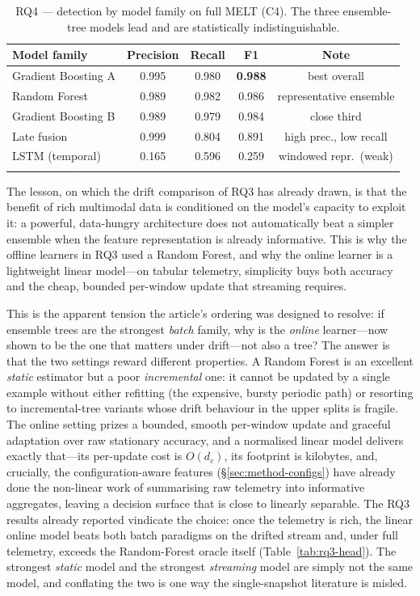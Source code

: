 \documentclass[pdflatex,sn-mathphys-num]{sn-jnl}%
\theoremstyle{thmstyleone}%
\theoremstyle{thmstyletwo}%
\theoremstyle{thmstylethree}%
\begin{document}
\begin{table}[t]
\caption{RQ4 --- detection by model family on full MELT (C4). The three ensemble-tree models lead and are statistically indistinguishable.}\label{tab:rq4}
\begin{tabular}{@{}lcccc@{}}
\toprule
Model family & Precision & Recall & F1 & Note \\
\midrule
Gradient Boosting A  & 0.995 & 0.980 & \textbf{0.988} & best overall \\
Random Forest        & 0.989 & 0.982 & 0.986 & representative ensemble \\
Gradient Boosting B  & 0.989 & 0.979 & 0.984 & close third \\
Late fusion          & 0.999 & 0.804 & 0.891 & high prec., low recall \\
LSTM (temporal)      & 0.165 & 0.596 & 0.259 & windowed repr.\ (weak) \\
\botrule
\end{tabular}
\end{table}

The lesson, on which the drift comparison of RQ3 has already drawn, is that the benefit of rich multimodal data is conditioned on the model's capacity to exploit it: a powerful, data-hungry architecture does not automatically beat a simpler ensemble when the feature representation is already informative. This is why the offline learners in RQ3 used a Random Forest, and why the online learner is a lightweight linear model---on tabular telemetry, simplicity buys both accuracy and the cheap, bounded per-window update that streaming requires.

This is the apparent tension the article's ordering was designed to resolve: if ensemble trees are the strongest \emph{batch} family, why is the \emph{online} learner---now shown to be the one that matters under drift---not also a tree? The answer is that the two settings reward different properties. A Random Forest is an excellent \emph{static} estimator but a poor \emph{incremental} one: it cannot be updated by a single example without either refitting (the expensive, bursty periodic path) or resorting to incremental-tree variants whose drift behaviour in the upper splits is fragile. The online setting prizes a bounded, smooth per-window update and graceful adaptation over raw stationary accuracy, and a normalised linear model delivers exactly that---its per-update cost is $O(d_c)$, its footprint is kilobytes, and, crucially, the configuration-aware features (\S\ref{sec:method-configs}) have already done the non-linear work of summarising raw telemetry into informative aggregates, leaving a decision surface that is close to linearly separable. The RQ3 results already reported vindicate the choice: once the telemetry is rich, the linear online model beats both batch paradigms on the drifted stream and, under full telemetry, exceeds the Random-Forest oracle itself (Table~\ref{tab:rq3-head}). The strongest \emph{static} model and the strongest \emph{streaming} model are simply not the same model, and conflating the two is one way the single-snapshot literature is misled.
\end{document}
